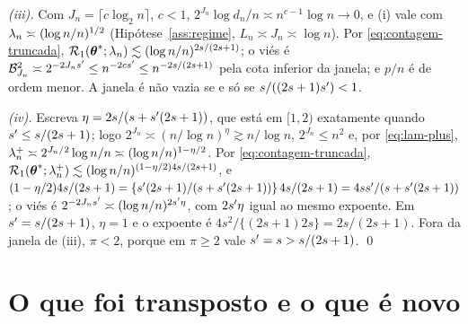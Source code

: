 \documentclass[11pt,a4paper]{article}
\begin{document}
\emph{(iii).} Com $J_{n} = \lceil c\log_{2}n\rceil$, $c < 1$,
$2^{J_{n}}\log d_{n}/n \asymp n^{c-1}\log n \to 0$, e (i) vale com $\lambda_{n}
\asymp (\log n/n)^{1/2}$ (Hipótese~\ref{ass:regime}, $L_{n} \asymp J_{n}
\asymp \log n$). Por \eqref{eq:contagem-truncada},
$\mathcal{R}_{1}(\boldsymbol{\theta}^{*};\lambda_{n}) \lesssim (\log n/n)^{2s/(2s+1)}$; o viés
é $\mathcal{B}_{J_{n}}^{2} \asymp 2^{-2J_{n}s'} \le n^{-2cs'} \le
n^{-2s/(2s+1)}$ pela cota inferior da janela; e $p/n$ é de ordem menor. A
janela é não vazia se e só se $s/((2s+1)s') < 1$.

\emph{(iv).} Escreva $\eta = 2s/(s+s'(2s+1))$, que está em $[1,2)$
exatamente quando $s' \le s/(2s+1)$; logo $2^{J_{n}} \asymp
(n/\log n)^{\eta} \gtrsim n/\log n$, $2^{J_{n}} \le n^{2}$ e, por
\eqref{eq:lam-plus}, $\lambda_{n}^{+} \asymp 2^{J_{n}/2}\log n/n \asymp
(\log n/n)^{1-\eta/2}$. Por \eqref{eq:contagem-truncada},
$\mathcal{R}_{1}(\boldsymbol{\theta}^{*};\lambda_{n}^{+}) \lesssim (\log
n/n)^{(1-\eta/2)4s/(2s+1)}$, e $(1-\eta/2)4s/(2s+1) =
\{s'(2s+1)/(s+s'(2s+1))\}\,4s/(2s+1) = 4ss'/(s+s'(2s+1))$; o viés é
$2^{-2J_{n}s'} \asymp (\log n/n)^{2s'\eta}$, com $2s'\eta$ igual ao
mesmo expoente. Em $s' = s/(2s+1)$, $\eta = 1$ e o expoente é
$4s^{2}/\{(2s+1)2s\} = 2s/(2s+1)$. Fora da janela de (iii), $\pi < 2$, porque
em $\pi \ge 2$ vale $s' = s > s/(2s+1)$. \qed

\section{O que foi transposto e o que é novo}
\end{document}
